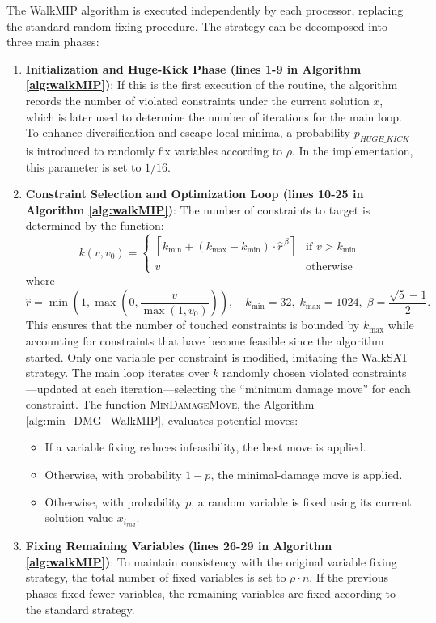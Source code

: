The WalkMIP algorithm is executed independently by each processor, replacing the standard random fixing procedure. The strategy can be decomposed into three main phases:

\begin{enumerate}
    \item \textbf{Initialization and Huge-Kick Phase (lines 1-9 in Algorithm \ref{alg:walkMIP})}: If this is the first execution of the routine, the algorithm records the number of violated constraints under the current solution $x$, which is later used to determine the number of iterations for the main loop. To enhance diversification and escape local minima, a probability $p_{HUGE\_KICK}$ is introduced to randomly fix variables according to $\rho$. In the implementation, this parameter is set to $1/16$.
    
    \item \textbf{Constraint Selection and Optimization Loop (lines 10-25 in Algorithm \ref{alg:walkMIP})}: The number of constraints to target is determined by the function:
    $$
    k(v, v_0) =
    \begin{cases}
    \left\lceil k_{\min} + (k_{\max}-k_{\min}) \cdot \hat{r}^{\,\beta} \right\rceil & \text{if } v > k_{\min} \\[0.5em]
    v & \text{otherwise}
    \end{cases}
    $$
    where
    $$
    \hat{r} = \min\!\left(1, \max\!\left(0, \frac{v}{\max(1, v_0)}\right)\right),\quad k_{\min}=32,\; k_{\max}=1024,\; \beta=\frac{\sqrt{5}-1}{2}.
    $$
    This ensures that the number of touched constraints is bounded by $k_{\max}$ while accounting for constraints that have become feasible since the algorithm started. Only one variable per constraint is modified, imitating the WalkSAT strategy. The main loop iterates over $k$ randomly chosen violated constraints---updated at each iteration---selecting the ``minimum damage move'' for each constraint. The function \textsc{MinDamageMove}, the Algorithm \ref{alg:min_DMG_WalkMIP}, evaluates potential moves:  
        \begin{itemize}
            \item If a variable fixing reduces infeasibility, the best move is applied.
            \item Otherwise, with probability $1-p$, the minimal-damage move is applied.
            \item Otherwise, with probability $p$, a random variable is fixed using its current solution value $x_{i_{rnd}}$.
        \end{itemize}
    
    \item \textbf{Fixing Remaining Variables (lines 26-29 in Algorithm \ref{alg:walkMIP})}: To maintain consistency with the original variable fixing strategy, the total number of fixed variables is set to $\rho \cdot n$. If the previous phases fixed fewer variables, the remaining variables are fixed according to the standard strategy.
\end{enumerate}

